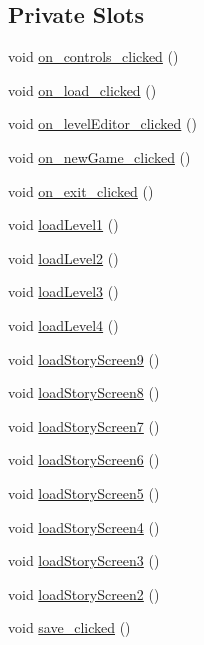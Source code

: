 \subsection*{Private Slots}
\begin{DoxyCompactItemize}
\item 
void \hyperlink{class_form_a5d619b8452dcafe406e6143c8de29169}{on\_\-controls\_\-clicked} ()
\item 
void \hyperlink{class_form_ad5cfc180c8653247d37045dcd7536f0b}{on\_\-load\_\-clicked} ()
\item 
void \hyperlink{class_form_af6626ed5a42cba30ec1e37f991940d58}{on\_\-levelEditor\_\-clicked} ()
\item 
void \hyperlink{class_form_af43a16a8fb1b1d955613a5aec4b87eea}{on\_\-newGame\_\-clicked} ()
\item 
void \hyperlink{class_form_ac7feff0f4e7f4872f0692b2f3d5854c2}{on\_\-exit\_\-clicked} ()
\item 
void \hyperlink{class_form_a5db4ecbdc1a9bc4ff8927b2a5a2da69f}{loadLevel1} ()
\item 
void \hyperlink{class_form_a36f1aac890405daee948054d44200149}{loadLevel2} ()
\item 
void \hyperlink{class_form_abca8ff816e3230388fe64d31a0ba10be}{loadLevel3} ()
\item 
void \hyperlink{class_form_a09242741a8ad563aec44c796dcec5a7c}{loadLevel4} ()
\item 
void \hyperlink{class_form_ad606b52ace6c58a2985f52b56ee099fb}{loadStoryScreen9} ()
\item 
void \hyperlink{class_form_abeec47265874e8a36c8e0cd0fdf00fc5}{loadStoryScreen8} ()
\item 
void \hyperlink{class_form_a8da2b417a6315a6bb664a1cea4389b4c}{loadStoryScreen7} ()
\item 
void \hyperlink{class_form_aca7f80e793fae48361bdca6c50c967a7}{loadStoryScreen6} ()
\item 
void \hyperlink{class_form_a13b7e32736d16ff41b5b8d9651db21a6}{loadStoryScreen5} ()
\item 
void \hyperlink{class_form_aaa5e8fc86af7da56f82ef3ea178ca5b3}{loadStoryScreen4} ()
\item 
void \hyperlink{class_form_a2c466a1ae32e4a9c45b2d285ae7abca8}{loadStoryScreen3} ()
\item 
void \hyperlink{class_form_a029cb26613cfb1d1ece1f403de8062aa}{loadStoryScreen2} ()
\item 
void \hyperlink{class_form_aefe8e4d932a234a6e50e93be2618bac3}{save\_\-clicked} ()

\end{DoxyCompactItemize}
